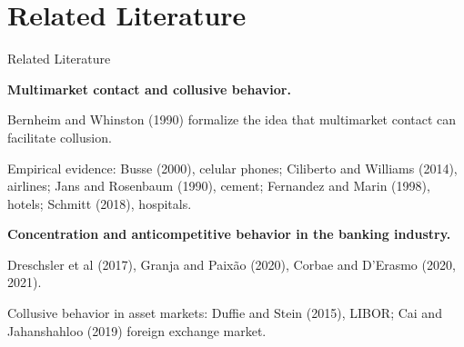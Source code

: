 \documentclass[notes,10.2pt, aspectratio=169]{beamer}
\newenvironment{wideitemize}{\itemize\addtolength{\itemsep}{10pt}}{\enditemize}
\begin{document}
\section{Related Literature}
\begin{frame}[label = lit]{Related Literature}

  \begin{wideitemize}
      \item \textbf{Multimarket contact and collusive behavior.}
      \vspace{0.2cm}
      \begin{wideitemize}
    
        \item Bernheim and Whinston (1990) formalize the idea that multimarket contact can facilitate collusion.
        \item Empirical evidence: Busse (2000), celular phones;
        Ciliberto and Williams (2014), airlines;
        Jans and Rosenbaum (1990), cement;
        Fernandez and Marin (1998), hotels;
        Schmitt (2018), hospitals.
        
      \end{wideitemize}


          \item \textbf{Concentration and anticompetitive behavior in the banking industry.}
          \vspace{0.2cm}
          \begin{wideitemize}
            \item  Dreschsler et al (2017), Granja and Paixão (2020), Corbae and D'Erasmo (2020, 2021).
            \item Collusive behavior in asset markets: Duffie and Stein (2015), LIBOR;  Cai and Jahanshahloo (2019) foreign exchange market. 
          \end{wideitemize}
      

  \end{wideitemize}
  
\end{frame}






    
\end{document}
